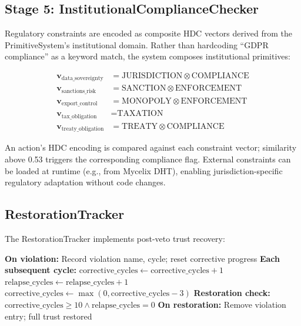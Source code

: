 \documentclass[11pt,a4paper]{article}
\begin{document}
\subsection{Stage 5: InstitutionalComplianceChecker}

Regulatory constraints are encoded as composite HDC vectors derived from the PrimitiveSystem's institutional domain. Rather than hardcoding ``GDPR compliance'' as a keyword match, the system composes institutional primitives:

\begin{align}
\mathbf{v}_{\text{data\_sovereignty}} &= \text{JURISDICTION} \otimes \text{COMPLIANCE} \\
\mathbf{v}_{\text{sanctions\_risk}} &= \text{SANCTION} \otimes \text{ENFORCEMENT} \\
\mathbf{v}_{\text{export\_control}} &= \text{MONOPOLY} \otimes \text{ENFORCEMENT} \\
\mathbf{v}_{\text{tax\_obligation}} &= \text{TAXATION} \\
\mathbf{v}_{\text{treaty\_obligation}} &= \text{TREATY} \otimes \text{COMPLIANCE}
\end{align}

An action's HDC encoding is compared against each constraint vector; similarity above 0.53 triggers the corresponding compliance flag. External constraints can be loaded at runtime (e.g., from Mycelix DHT), enabling jurisdiction-specific regulatory adaptation without code changes.

\subsection{RestorationTracker}

The RestorationTracker implements post-veto trust recovery:

\begin{algorithm}
\caption{Restorative Justice Protocol}
\label{alg:restoration}
\begin{algorithmic}[1]
\STATE \textbf{On violation:} Record violation name, cycle; reset corrective progress
\STATE \textbf{Each subsequent cycle:}
  \STATE $\text{corrective\_cycles} \leftarrow \text{corrective\_cycles} + 1$
  \STATE $\text{relapse\_cycles} \leftarrow \text{relapse\_cycles} + 1$
  \STATE $\text{corrective\_cycles} \leftarrow \max(0, \text{corrective\_cycles} - 3)$ 
\ENDIF
\STATE \textbf{Restoration check:} $\text{corrective\_cycles} \geq 10 \wedge \text{relapse\_cycles} = 0$
\STATE \textbf{On restoration:} Remove violation entry; full trust restored
\end{algorithmic}
\end{algorithm}
\end{document}
